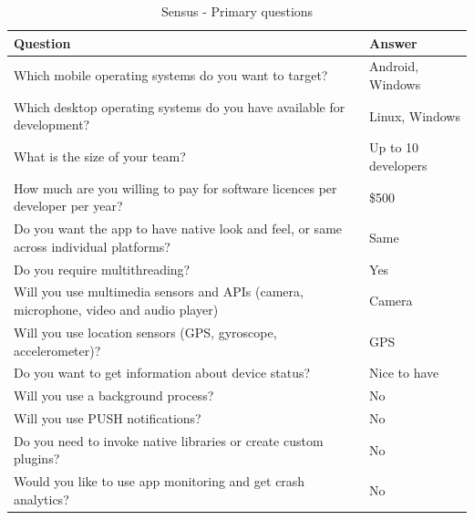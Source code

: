 \documentclass[english,master,public,dept460,male,cpdeclaration,oneside]{diploma}
\begin{document}
\begin{table}[!h]
	\centering
	\caption{Sensus - Primary questions}
	\label{table:sensusPrimary}
	\begin{tabular}{p{7.5cm} | p{5cm}}
		\toprule		
		\textbf{Question} &	\textbf{Answer}\\
		\midrule
		Which mobile operating systems do you want to target? &	Android, Windows \\
		Which desktop operating systems do you have available for development? & Linux, Windows \\
		What is the size of your team? & Up to 10 developers \\
		How much are you willing to pay for software licences per developer per year? & \$500 \\
		Do you want the app to have native look and feel, or same across individual platforms? & Same \\
		Do you require multithreading? & Yes \\
		Will you use multimedia sensors and APIs (camera, microphone, video and audio player) & Camera  \\
		Will you use location sensors (GPS, gyroscope, accelerometer)? & GPS \\
		Do you want to get information about device status? & Nice to have \\
		Will you use a background process? & No \\
		Will you use PUSH notifications? & No \\
		Do you need to invoke native libraries or create custom plugins? & No \\
		Would you like to use app monitoring and get crash analytics? & No \\		
		\midrule
	\end{tabular}
\end{table}
\end{document}
